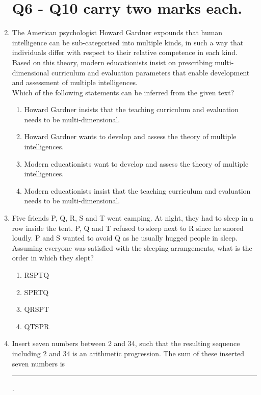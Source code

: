 \documentclass[journal]{IEEEtran}
\numberwithin{equation}{enumi}
\numberwithin{figure}{enumi}
\begin{document}
\begin{enumerate}
\section{Q6 - Q10 carry two marks each.}
\item The American psychologist Howard Gardner expounds that human intelligence can be sub-categorised into multiple kinds, in such a way that individuals differ with respect to their relative competence in each kind. Based on this theory, modern educationists insist on prescribing multi-dimensional curriculum and evaluation parameters that enable development and assessment of multiple intelligences. \\
Which of the following statements can be inferred from the given text?
	\begin{enumerate}
                \item Howard Gardner insists that the teaching curriculum and evaluation needs to be multi-dimensional.
                \item Howard Gardner wants to develop and assess the theory of multiple intelligences.
                \item Modern educationists want to develop and assess the theory of multiple intelligences.
                \item Modern educationists insist that the teaching curriculum and evaluation needs to be multi-dimensional.
        \end{enumerate}
\item Five friends P, Q, R, S and T went camping. At night, they had to sleep in a row inside the tent. P, Q and T refused to sleep next to R since he snored loudly. P and S wanted to avoid Q as he usually hugged people in sleep. \\
Assuming everyone was satisfied with the sleeping arrangements, what is the order in which they slept?
	\begin{enumerate}
                \item RSPTQ 
                \item SPRTQ
                \item QRSPT
                \item QTSPR
        \end{enumerate}
\item Insert seven numbers between 2 and 34, such that the resulting sequence including 2 and 34 is an arithmetic progression. The sum of these inserted seven numbers is \rule{1cm}{0.4pt}.
	\begin{enumerate}

\end{enumerate}
\end{enumerate}
\end{document}
